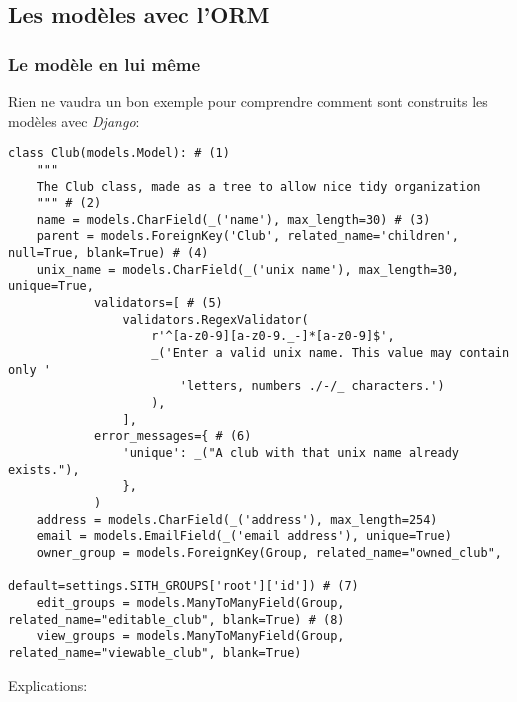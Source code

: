 \documentclass[a4paper]{report}
\begin{document}
\subsection{Les modèles avec l'ORM}
\label{sub:les_modèles_avec_l_orm}

\subsubsection{Le modèle en lui même}
\label{ssub:Le modèle en lui même}
\par Rien ne vaudra un bon exemple pour comprendre comment sont construits les modèles avec \emph{Django}:
\begin{addmargin}[-7em]{0em}
    \begin{verbatim}
class Club(models.Model): # (1)
    """
    The Club class, made as a tree to allow nice tidy organization
    """ # (2)
    name = models.CharField(_('name'), max_length=30) # (3)
    parent = models.ForeignKey('Club', related_name='children', null=True, blank=True) # (4)
    unix_name = models.CharField(_('unix name'), max_length=30, unique=True,
            validators=[ # (5)
                validators.RegexValidator(
                    r'^[a-z0-9][a-z0-9._-]*[a-z0-9]$',
                    _('Enter a valid unix name. This value may contain only '
                        'letters, numbers ./-/_ characters.')
                    ),
                ],
            error_messages={ # (6)
                'unique': _("A club with that unix name already exists."),
                },
            )
    address = models.CharField(_('address'), max_length=254)
    email = models.EmailField(_('email address'), unique=True)
    owner_group = models.ForeignKey(Group, related_name="owned_club",
                                    default=settings.SITH_GROUPS['root']['id']) # (7)
    edit_groups = models.ManyToManyField(Group, related_name="editable_club", blank=True) # (8)
    view_groups = models.ManyToManyField(Group, related_name="viewable_club", blank=True)
\end{verbatim}
\end{addmargin}
\par Explications:
\end{document}
